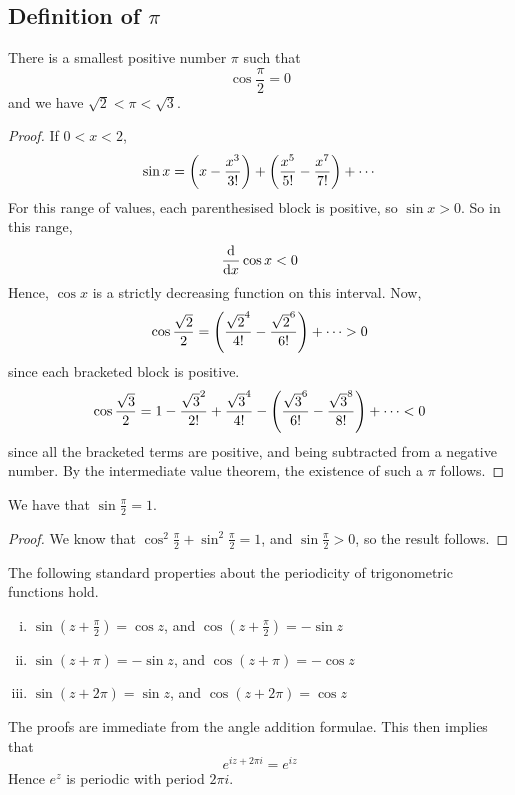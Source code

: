 \subsection{Definition of \(\pi\)}
\begin{proposition}
	There is a smallest positive number \(\pi\) such that
	\[
		\cos \frac{\pi}{2} = 0
	\]
	and we have \(\sqrt{2} < \pi < \sqrt{3}\).
\end{proposition}
\begin{proof}
	If \(0 < x < 2\),
	\[
		\sin x = \qty(x - \frac{x^3}{3!}) + \qty(\frac{x^5}{5!} - \frac{x^7}{7!}) + \cdots
	\]
	For this range of values, each parenthesised block is positive, so \(\sin x > 0\).
	So in this range,
	\[
		\dv{x} \cos x < 0
	\]
	Hence, \(\cos x\) is a strictly decreasing function on this interval.
	Now,
	\[
		\cos \frac{\sqrt{2}}{2} = \qty(\frac{\sqrt{2}^4}{4!} - \frac{\sqrt{2}^6}{6!}) + \cdots > 0
	\]
	since each bracketed block is positive.
	\[
		\cos \frac{\sqrt{3}}{2} = 1 - \frac{\sqrt{3}^2}{2!} + \frac{\sqrt{3}^4}{4!} - \qty(\frac{\sqrt{3}^6}{6!} - \frac{\sqrt{3}^8}{8!}) + \cdots < 0
	\]
	since all the bracketed terms are positive, and being subtracted from a negative number.
	By the intermediate value theorem, the existence of such a \(\pi\) follows.
\end{proof}
\begin{corollary}
	We have that \(\sin \frac{\pi}{2} = 1\).
\end{corollary}
\begin{proof}
	We know that \(\cos^2 \frac{\pi}{2} + \sin^2 \frac{\pi}{2} = 1\), and \(\sin \frac{\pi}{2} > 0\), so the result follows.
\end{proof}
\begin{theorem}
	The following standard properties about the periodicity of trigonometric functions hold.
	\begin{enumerate}[(i)]
		\item \(\sin(z + \frac{\pi}{2}) = \cos z\), and \(\cos(z + \frac{\pi}{2}) = -\sin z\)
		\item \(\sin(z + \pi) = -\sin z\), and \(\cos(z + \pi) = -\cos z\)
		\item \(\sin(z + 2 \pi) = \sin z\), and \(\cos(z + 2\pi) = \cos z\)
	\end{enumerate}
\end{theorem}
\noindent The proofs are immediate from the angle addition formulae.
This then implies that
\[
	e^{iz + 2\pi i} = e^{iz}
\]
Hence \(e^{z}\) is periodic with period \(2 \pi i\).
